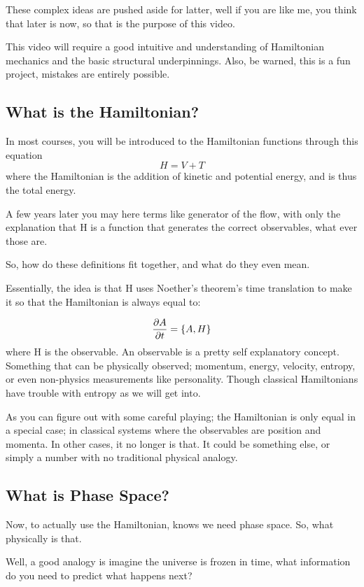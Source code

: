 These complex ideas are pushed aside for latter, well if you are like me, you think that later is now, so that is the purpose of this video.

This video will require a good intuitive and understanding of Hamiltonian mechanics and the basic structural underpinnings. Also, be warned, this is a fun project, mistakes are entirely possible.

\subsection{What is the Hamiltonian?}

In most courses, you will be introduced to the Hamiltonian functions through this equation
\[
	H = V + T
\]
where the Hamiltonian is the addition of kinetic and potential energy, and is thus the total energy.

A few years later you may here terms like generator of the flow, with only the explanation that H is a function that generates the correct observables, what ever those are.

So, how do these definitions fit together, and what do they even mean.

Essentially, the idea is that H uses Noether's theorem's time translation to make it so that the Hamiltonian is always equal to:

\[
	\pdv{A}{t} = \left\{A,H  \right\}
\]
where H is the observable. An observable is a pretty self explanatory concept. Something that can be physically observed; momentum, energy, velocity, entropy, or even non-physics measurements like personality. Though classical Hamiltonians have trouble with entropy as we will get into.

As you can figure out with some careful playing; the Hamiltonian is only equal in a special case; in classical systems where the observables are position and momenta. In other cases, it no longer is that. It could be something else, or simply a number with no traditional physical analogy.



\subsection{What is Phase Space?}
Now, to actually use the Hamiltonian, knows we need phase space. So, what physically is that.

Well, a good analogy is imagine the universe is frozen in time, what information do you need to predict what happens next?


